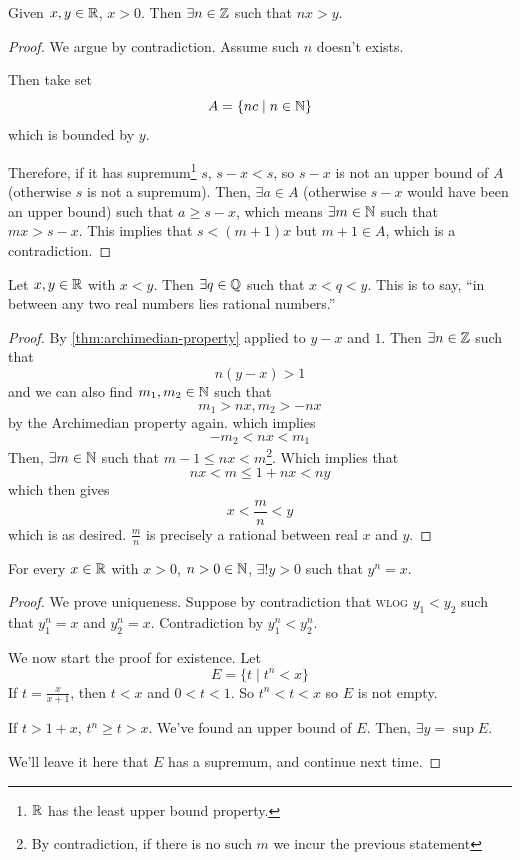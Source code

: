 \begin{theorem}
    \label{thm:archimedian-property}
    Given $x, y\in \mathbb R$, $x > 0$. Then $\exists n\in \mathbb Z$ such that $nx > y$.
\end{theorem}
\begin{proof}
    We argue by contradiction. Assume such $n$ doesn't exists.

    Then take set
    \[A = \left\{ nc \mid n\in\mathbb N \right\}\]
    which is bounded by $y$.

    Therefore, if it has supremum\footnote{$\mathbb R$ has the least upper bound property.} $s$, $s-x < s$, so $s-x$ is not an upper bound of $A$ (otherwise $s$ is not a supremum). Then, $\exists a\in A$ (otherwise $s-x$ would have been an upper bound) such that $a \geq s - x$, which means $\exists m\in \mathbb N$ such that $mx > s-x$. This implies that $s < (m+1)x$ but $m+1\in A$, which is a contradiction.
\end{proof}

\begin{corollary}
    Let $x, y\in\mathbb R$ with $x < y$. Then $\exists q\in \mathbb Q$ such that $x < q < y$. This is to say, ``in between any two real numbers lies rational numbers.''
\end{corollary}
\begin{proof}
    By \cref{thm:archimedian-property} applied to $y-x$ and $1$. Then $\exists n\in\mathbb Z$ such that
    \[n(y-x) > 1\]
    and we can also find $m_1, m_2\in\mathbb N$ such that
    \[m_1 > nx, m_2 > -nx\]
    by the Archimedian property again.
    which implies
    \[-m_2 < nx < m_1\]
    Then, $\exists m\in \mathbb N$ such that $m-1 \leq nx < m$\footnote{By contradiction, if there is no such $m$ we incur the previous statement}. Which implies that
    \[nx < m \leq 1 + nx < ny\]
    which then gives
    \[x < \frac{m}{n} < y\]
    which is as desired. $\frac{m}{n}$ is precisely a rational between real $x$ and $y$.
\end{proof}

\begin{theorem}
    For every $x\in\mathbb R$ with $x > 0$, $n > 0\in \mathbb N$, $\exists! y > 0$ such that $y^n = x$.
\end{theorem}
\begin{proof}
    We prove uniqueness. Suppose by contradiction that \textsc{wlog} $y_1 < y_2$ such that $y_1 ^ n = x$ and $y_2^n = x$. Contradiction by $y_1^n < y_2^n$.

    We now start the proof for existence. Let
    \[E = \{t\mid t^n < x\}\]
    If $t = \frac{x}{x+1}$, then $t < x$ and $0 < t < 1$. So $t^n < t < x$ so $E$ is not empty.

    If $t > 1 + x$, $t^n \geq t > x$. We've found an upper bound of $E$. Then, $\exists y = \sup E$.

    We'll leave it here that $E$ has a supremum, and continue next time.
\end{proof}